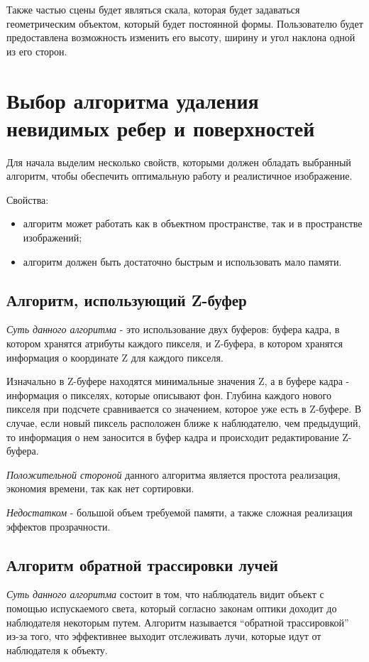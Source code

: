 Также частью сцены будет являться скала, которая будет задаваться геометрическим объектом, который будет постоянной формы. Пользователю будет предоставлена возможность изменить его высоту, ширину и угол наклона одной из его сторон.



\section{Выбор алгоритма удаления невидимых ребер и поверхностей}
Для начала выделим несколько свойств, которыми должен обладать выбранный алгоритм, чтобы обеспечить оптимальную работу и реалистичное изображение.

Свойства:
\begin{itemize} 
    \item алгоритм может работать как в объектном пространстве, так и в пространстве изображений;
    \item алгоритм должен быть достаточно быстрым и использовать мало памяти.
\end{itemize}


\subsection{Алгоритм, использующий Z-буфер}
\textit{Суть данного алгоритма} - это использование двух буферов: буфера кадра, в котором хранятся атрибуты каждого пикселя, и Z-буфера, в котором хранятся информация о координате Z для каждого пикселя.

Изначально в Z-буфере находятся минимальные значения Z, а в буфере кадра - информация о пикселях, которые описывают фон. Глубина каждого нового пикселя при подсчете сравнивается со значением, которое уже есть в Z-буфере. В случае, если новый пиксель расположен ближе к наблюдателю, чем предыдущий, то информация о нем заносится в буфер кадра и происходит редактирование Z-буфера.

\textit{Положительной стороной} данного алгоритма является простота реализация, экономия времени, так как нет сортировки.

\textit{Недостатком} - большой объем требуемой памяти, а также сложная реализация эффектов прозрачности.


\subsection{Алгоритм обратной трассировки лучей}
\textit{Суть данного алгоритма} состоит в том, что наблюдатель видит объект с помощью испускаемого света, который согласно законам оптики доходит до наблюдателя некоторым путем. Алгоритм называется “обратной трассировкой” из-за того, что эффективнее выходит отслеживать лучи, которые идут от наблюдателя к объекту.

